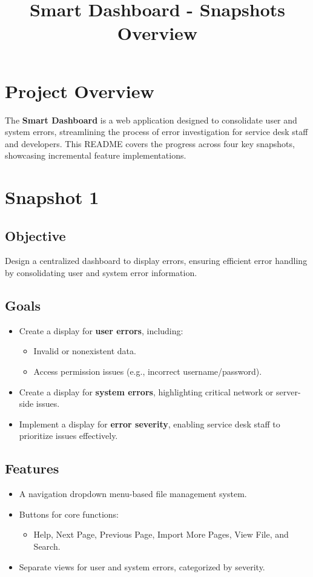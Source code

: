 \documentclass[12pt]{article}
\title{Smart Dashboard - Snapshots Overview}
\author{}
\date{}
\begin{document}
\maketitle

\section*{Project Overview}
The \textbf{Smart Dashboard} is a web application designed to consolidate user and system errors, streamlining the process of error investigation for service desk staff and developers. This README covers the progress across four key snapshots, showcasing incremental feature implementations.

\section{Snapshot 1}
\subsection*{Objective}
Design a centralized dashboard to display errors, ensuring efficient error handling by consolidating user and system error information.

\subsection*{Goals}
\begin{itemize}
    \item Create a display for \textbf{user errors}, including:
    \begin{itemize}
        \item Invalid or nonexistent data.
        \item Access permission issues (e.g., incorrect username/password).
    \end{itemize}
    \item Create a display for \textbf{system errors}, highlighting critical network or server-side issues.
    \item Implement a display for \textbf{error severity}, enabling service desk staff to prioritize issues effectively.
\end{itemize}

\subsection*{Features}
\begin{itemize}
    \item A navigation dropdown menu-based file management system.
    \item Buttons for core functions:
    \begin{itemize}
        \item Help, Next Page, Previous Page, Import More Pages, View File, and Search.
    \end{itemize}
    \item Separate views for user and system errors, categorized by severity.
\end{itemize}
\end{document}
